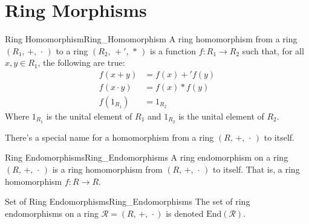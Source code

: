 \section{Ring Morphisms}
    \begin{fdefinition}{Ring Homomorphism}{Ring_Homomorphism}
        A \gls{ring homomorphism} from a \gls{ring}
        $(R_{1},\,+,\,\cdot\,)$ to a ring $(R_{2},\,+',\,*\,)$ is a
        \gls{function} $f:R_{1}\rightarrow{R}_{2}$ such that, for all
        $x,y\in{R}_{1}$, the following are true:
        \begin{align}
            f(x+y)&=f(x)+'f(y)
            \tag{Preservation of Addition}\\
            f(x\cdot{y})&=f(x)*f(y)
            \tag{Preservation of Multiplication}\\
            f(1_{R_{1}})&=1_{R_{2}}
            \tag{Preservation of Identities}
        \end{align}
        Where $1_{R_{1}}$ is the unital element of $R_{1}$ and
        $1_{R_{2}}$ is the unital element of $R_{2}$.
    \end{fdefinition}
    There's a special name for a homomorphism from a ring $(R,\,+,\,\cdot\,)$
    to itself.
    \begin{fdefinition}{Ring Endomorphisms}{Ring_Endomorphisms}
        A \gls{ring endomorphism} on a \gls{ring}
        $(R,\,+,\,\cdot\,)$ is a \gls{ring homomorphism} from
        $(R,\,+,\,\cdot\,)$ to itself. That is, a ring homomorphism
        $f:R\rightarrow{R}$.
    \end{fdefinition}
    \begin{fnotation}{Set of Ring Endomorphisms}{Ring_Endomorphisms}
        The set of ring endomorphisms on a ring $\mathcal{R}=(R,\,+,\,\cdot)$
        is denoted $\textrm{End}(\mathcal{R})$.
    \end{fnotation}